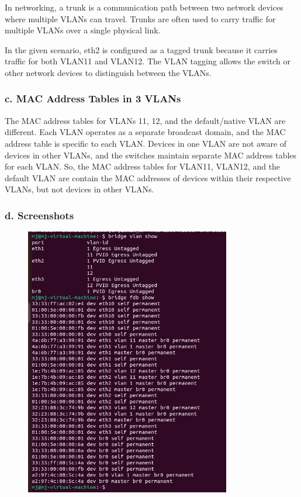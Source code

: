 \documentclass{report}
\begin{document}
In networking, a trunk is a communication path between two network devices where multiple VLANs can travel.
Trunks are often used to carry traffic for multiple VLANs over a single physical link.

In the given scenario, eth2 is configured as a tagged trunk because it carries traffic for both VLAN11 and VLAN12.
The VLAN tagging allows the switch or other network devices to distinguish between the VLANs.

\subsubsection*{c. MAC Address Tables in 3 VLANs}
The MAC address tables for VLANs 11, 12, and the default/native VLAN are different. 
Each VLAN operates as a separate broadcast domain, and the MAC address table is specific to each VLAN.
Devices in one VLAN are not aware of devices in other VLANs, and the switches maintain separate MAC address tables for each VLAN.
So, the MAC address tables for VLAN11, VLAN12, and the default VLAN are contain the MAC addresses of devices within their respective VLANs, but not devices in other VLANs.
\newpage
\subsubsection*{d. Screenshots}
\begin{figure}[h] 
  \centering 
  \includegraphics[width=0.8\textwidth]{31.jpg} 
\end{figure} 
\end{document}
